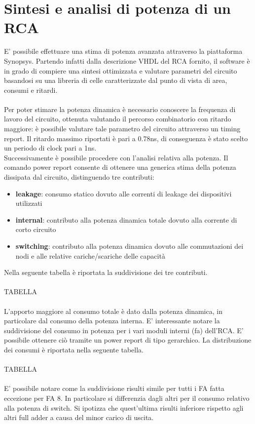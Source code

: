 \documentclass[11pt,  english, makeidx, a4paper, titlepage, oneside]{book}
\begin{document}
\section{Sintesi e analisi di potenza di un RCA}
E' possibile effettuare una stima di potenza avanzata attraverso la piattaforma Synopsys. 
Partendo infatti dalla descrizione VHDL del RCA fornito, il software è in grado di compiere una sintesi ottimizzata e valutare parametri del circuito basandosi su una libreria di celle caratterizzate dal punto di vista di area, consumi e ritardi.
\\\\
Per poter stimare la potenza dinamica è necessario conoscere la frequenza di lavoro del circuito, ottenuta valutando il percorso combinatorio con ritardo maggiore: è possibile valutare tale parametro del circuito attraverso un timing report.
Il ritardo massimo riportati è pari a 0.78ns, di conseguenza è stato scelto un periodo di clock pari a 1ns.\\
Successivamente è possibile procedere con l'analisi relativa alla potenza.
Il comando power report consente di ottenere una generica stima della potenza dissipata dal circuito, distinguendo tre contributi:
\begin{itemize}
\item \textbf{leakage}: consumo statico dovuto alle correnti di leakage dei dispositivi utilizzati
\item \textbf{internal}: contributo alla potenza dinamica totale dovuto alla corrente di corto circuito
\item \textbf{switching}: contributo alla potenza dinamica dovuto alle commutazioni dei nodi e alle relative cariche/scariche delle capacità
\end{itemize}
Nella seguente tabella è riportata la suddivisione dei tre contributi.
\\\\
TABELLA
\\\\
L'apporto maggiore al consumo totale è dato dalla potenza dinamica, in particolare dal consumo della potenza interna.
E' interessante notare la suddivisione del consumo in potenza per i vari moduli interni (fa) dell'RCA. E' possibile ottenere ciò tramite un power report di tipo gerarchico. La distribuzione dei consumi è riportata nella seguente tabella.
\\\\
TABELLA
\\\\
E' possibile notare come la suddivisione risulti simile per tutti i FA fatta eccezione per FA 8. In particolare si differenzia dagli altri per il consumo relativo alla potenza di switch. Si ipotizza che quest'ultima risulti inferiore rispetto agli altri full adder a causa del minor carico di uscita.
\end{document}
